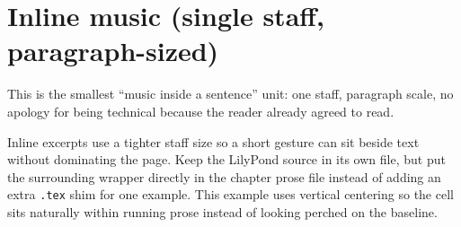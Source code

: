 \section{Inline music (single staff, paragraph-sized)}

This is the smallest ``music inside a sentence'' unit: one staff, paragraph scale, no apology for being technical because the reader already agreed to read.

Inline excerpts use a tighter staff size so a short gesture can sit beside text without dominating the page. Keep the LilyPond source in its own file, but put the surrounding wrapper directly in the chapter prose file instead of adding an extra \texttt{.tex} shim for one example. This example uses vertical centering so the cell sits naturally within running prose instead of looking perched on the baseline.

\begingroup
\beginBookInlineMusic
{}
\finishBookInlineMusic
\endgroup
